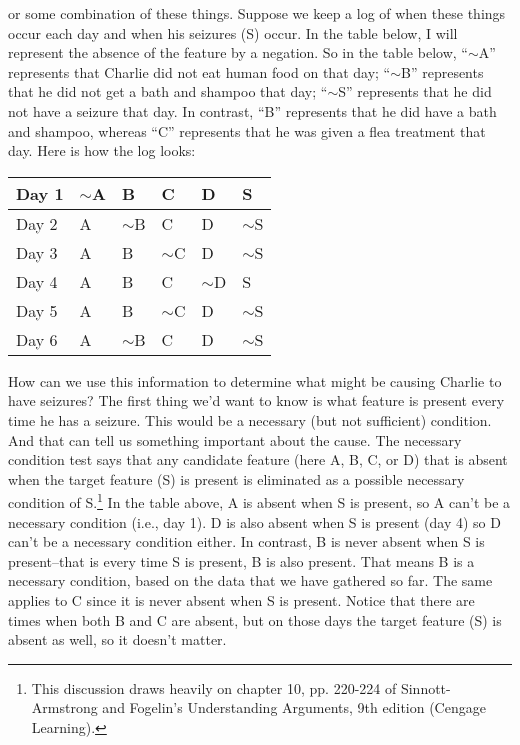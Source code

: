 or some combination of these things. Suppose we keep a log of when these
things occur each day and when his seizures (S) occur. In the table below, I will
represent the absence of the feature by a negation. So in the table below, ``$\sim$A''
represents that Charlie did not eat human food on that day; ``$\sim$B'' represents
that he did not get a bath and shampoo that day; ``$\sim$S'' represents that he did
not have a seizure that day. In contrast, ``B'' represents that he did have a bath
and shampoo, whereas ``C'' represents that he was given a flea treatment that
day. Here is how the log looks:


\begin{table}[htp]
\begin{tabular}{|l|l|l|l|l|l|}
\hline
Day 1 & $\sim$A & B       & C       & D       & S       \\
\hline
Day 2 & A       & $\sim$B & C       & D       & $\sim$S \\
\hline
Day 3 & A       & B       & $\sim$C & D       & $\sim$S \\
\hline
Day 4 & A       & B       & C       & $\sim$D & S       \\
\hline
Day 5 & A       & B       & $\sim$C & D       & $\sim$S \\
\hline
Day 6 & A       & $\sim$B & C       & D       & $\sim$S \\
\hline
\end{tabular}
\end{table}


How can we use this information to determine what might be causing Charlie to
have seizures? The first thing we'd want to know is what feature is present every
time he has a seizure. This would be a necessary (but not sufficient) condition.
And that can tell us something important about the cause. The necessary
condition test says that any candidate feature (here A, B, C, or D) that is absent
when the target feature (S) is present is eliminated as a possible necessary
condition of S.\footnote{This discussion draws heavily on chapter 10, pp. 220-224 of 
Sinnott-Armstrong and Fogelin's
Understanding Arguments, 9th edition (Cengage Learning).}
In the table above, A is absent when S is present, so A can't be a
necessary condition (i.e., day 1). D is also absent when S is present (day 4) so D
can't be a necessary condition either. In contrast, B is never absent when S is
present--that is every time S is present, B is also present. That means B is a
necessary condition, based on the data that we have gathered so far. The same
applies to C since it is never absent when S is present. Notice that there are
times when both B and C are absent, but on those days the target feature (S) is
absent as well, so it doesn't matter.

